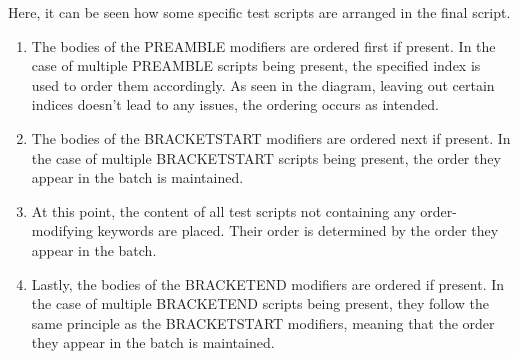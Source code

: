 Here, it can be seen how some specific test scripts are arranged in the final script.

\begin{enumerate}
    \item The bodies of the PREAMBLE modifiers are ordered first if present. In the case of multiple PREAMBLE scripts being present, the specified index is used to order them accordingly. As seen in the diagram, leaving out certain indices doesn't lead to any issues, the ordering occurs as intended.
    
    \item The bodies of the BRACKETSTART modifiers are ordered next if present. In the case of multiple BRACKETSTART scripts being present, the order they appear in the batch is maintained.
    
    \item At this point, the content of all test scripts not containing any order-modifying keywords are placed. Their order is determined by the order they appear in the batch.
    
    \item Lastly, the bodies of the BRACKETEND modifiers are ordered if present. In the case of multiple BRACKETEND scripts being present, they follow the same principle as the BRACKETSTART modifiers, meaning that the order they appear in the batch is maintained.
\end{enumerate}